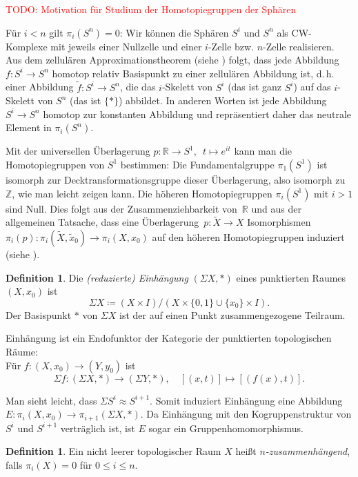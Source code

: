 \documentclass[11pt, a4paper, german]{article}
\theoremstyle{definition}
\newtheorem{defn}[lem]{Definition}
\theoremstyle{remark}
\newcommand{\TODO}[1]{\textcolor{red}{TODO: #1}} %
\newcommand{\R}{\mathbb{R}} %
\newcommand{\Z}{\mathbb{Z}} %
\renewcommand{\dh}{d.\,h.} %
\begin{document}
\TODO{Motivation für Studium der Homotopiegruppen der Sphären}

Für $i < n$ gilt $\pi_i(S^n) = 0$:
Wir können die Sphären $S^i$ und $S^n$ als CW-Komplexe mit jeweils einer Nullzelle und einer $i$-Zelle bzw. $n$-Zelle realisieren.
Aus dem zellulären Approximationstheorem (siehe \cite[\mbox{}Thm 4.8]{hatcher:at}) folgt, dass jede Abbildung $f : S^i \to S^n$ homotop relativ Basispunkt zu einer zellulären Abbildung ist, \dh{} einer Abbildung $\tilde{f} : S^i \to S^n$, die das $i$-Skelett von $S^i$ (das ist ganz $S^i$) auf das $i$-Skelett von $S^n$ (das ist $\{ * \}$) abbildet.
In anderen Worten ist jede Abbildung $S^i \to S^n$ homotop zur konstanten Abbildung und repräsentiert daher das neutrale Element in $\pi_i(S^n)$.

Mit der universellen Überlagerung $p : \R \to S^1, \enspace t \mapsto e^{it}$ kann man die Homotopiegruppen von $S^1$ bestimmen:
Die Fundamentalgruppe $\pi_1(S^1)$ ist isomorph zur Decktransformationsgruppe dieser Überlagerung, also isomorph zu~$\Z$, wie man leicht zeigen kann.
Die höheren Homotopiegruppen $\pi_i(S^1)$ mit $i > 1$ sind Null.
Dies folgt aus der Zusammenziehbarkeit von~$\R$ und aus der allgemeinen Tatsache, dass eine Überlagerung~$p : \widetilde{X} \to X$ Isomorphismen $\pi_i(p) : \pi_i(\widetilde{X}, \widetilde{x}_0) \to \pi_i(X, x_0)$ auf den höheren Homotopiegruppen induziert (siehe \cite[\mbox{}Prop 4.1]{hatcher:at}).

\begin{defn}
  Die \emph{(reduzierte) Einhängung} $(\Sigma X, *)$ eines punktierten Raumes $(X, x_0)$ ist
  \[ \Sigma X \coloneqq (X \times I) / (X \times \{ 0, 1 \} \cup \{ x_0 \} \times I). \]
  Der Basispunkt $*$ von $\Sigma X$ ist der auf einen Punkt zusammengezogene Teilraum.
\end{defn}

Einhängung ist ein Endofunktor der Kategorie der punktierten topologischen Räume: \\
Für $f : (X, x_0) \to (Y, y_0)$ ist
\[
  \Sigma f : (\Sigma X, *) \to (\Sigma Y, *), \quad
  [(x, t)] \mapsto [(f(x), t)].
\]

Man sieht leicht, dass $\Sigma S^i \approx S^{i+1}$.
Somit induziert Einhängung eine Abbildung $E : \pi_i(X, x_0) \to \pi_{i+1}(\Sigma X, *)$.
Da Einhängung mit den Kogruppenstruktur von $S^i$ und $S^{i+1}$ verträglich ist, ist $E$ sogar ein Gruppenhomomorphismus.

\begin{defn}
  Ein nicht leerer topologischer Raum $X$ heißt \emph{$n$-zusammenhängend}, falls $\pi_i(X) = 0$ für $0 \leq i \leq n$.
\end{defn}
\end{document}
